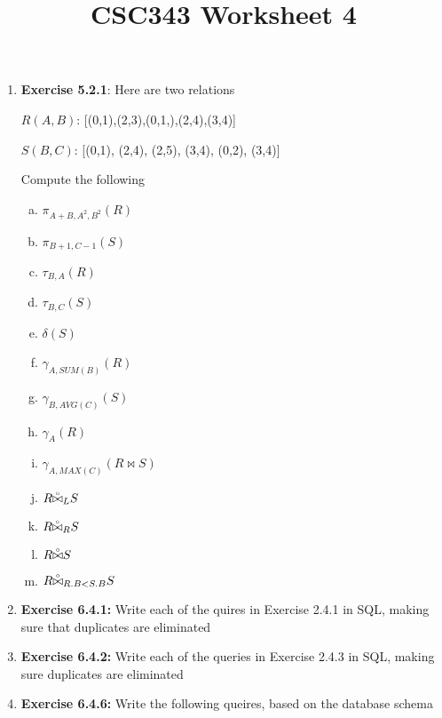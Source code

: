 \documentclass[12pt]{article}
\begin{document}
\title{CSC343 Worksheet 4}
\maketitle

\bigskip

\begin{enumerate}[1.]
    \item \textbf{Exercise 5.2.1}: Here are two relations

    \bigskip

    $R(A,B)$: [(0,1),(2,3),(0,1,),(2,4),(3,4)]

    \bigskip

    $S(B,C)$: [(0,1), (2,4), (2,5), (3,4), (0,2), (3,4)]

    \bigskip

    Compute the following

    \begin{enumerate}[a)]
        \item $\pi_{A+B,A^2,B^2}(R)$
        \item $\pi_{B+1,C-1}(S)$
        \item $\tau_{B,A}(R)$
        \item $\tau_{B,C}(S)$
        \item $\delta(S)$
        \item $\gamma_{A, SUM(B)}(R)$
        \item $\gamma_{B, AVG(C)}(S)$
        \item $\gamma_A(R)$
        \item $\gamma_{A, MAX(C)}(R \bowtie S)$
        \item $R \accentset{\circ}{\bowtie}_L S$
        \item $R \accentset{\circ}{\bowtie}_R S$
        \item $R \accentset{\circ}{\bowtie} S$
        \item $R \accentset{\circ}{\bowtie}_{R.B < S.B} S$
    \end{enumerate}

    \item \textbf{Exercise 6.4.1:} Write each of the quires in Exercise 2.4.1 in SQL,
    making sure that duplicates are eliminated

    \item \textbf{Exercise 6.4.2:} Write each of the queries in Exercise 2.4.3 in
    SQL, making sure duplicates are eliminated

    \item \textbf{Exercise 6.4.6:} Write the following queires, based on the database
    schema


\end{enumerate}
\end{document}
